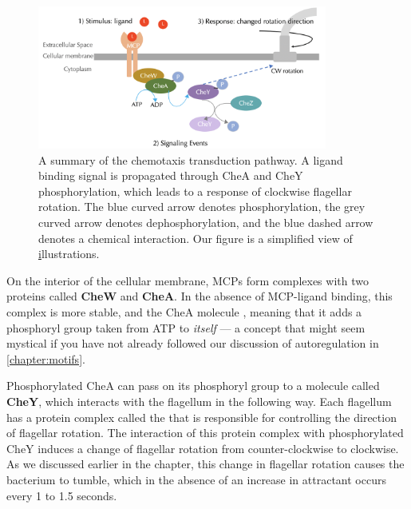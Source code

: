 \begin{figure}[h]
\centering
\mySfFamily
\includegraphics[width = 0.85\textwidth]{../images/chemotaxisphosnew.png}
\caption{A summary of the chemotaxis transduction pathway. A ligand binding signal is propagated through CheA and CheY phosphorylation, which leads to a response of clockwise flagellar rotation. The blue curved arrow denotes phosphorylation, the grey curved arrow denotes dephosphorylation, and the blue dashed arrow denotes a chemical interaction. Our figure is a simplified view of \href{http://chemotaxis.biology.utah.edu/Parkinson_Lab/projects/ecolichemotaxis/ecolichemotaxis.html} illustrations.}
\label{fig:chemotaxisphosnew}
\end{figure}


On the interior of the cellular membrane, MCPs form complexes with two proteins called \textbf{CheW} and \textbf{CheA}. In the absence of MCP-ligand binding, this complex is more stable, and the CheA molecule , meaning that it adds a phosphoryl group taken from ATP to \textit{itself} --- a concept that might seem mystical if you have not already followed our discussion of autoregulation in \autoref{chapter:motifs}.

Phosphorylated CheA can pass on its phosphoryl group to a molecule called \textbf{CheY}, which interacts with the flagellum in the following way. Each flagellum has a protein complex called the  that is responsible for controlling the direction of flagellar rotation. The interaction of this protein complex with phosphorylated CheY induces a change of flagellar rotation from counter-clockwise to clockwise. As we discussed earlier in the chapter, this change in flagellar rotation causes the bacterium to tumble, which in the absence of an increase in attractant occurs every 1 to 1.5 seconds.

